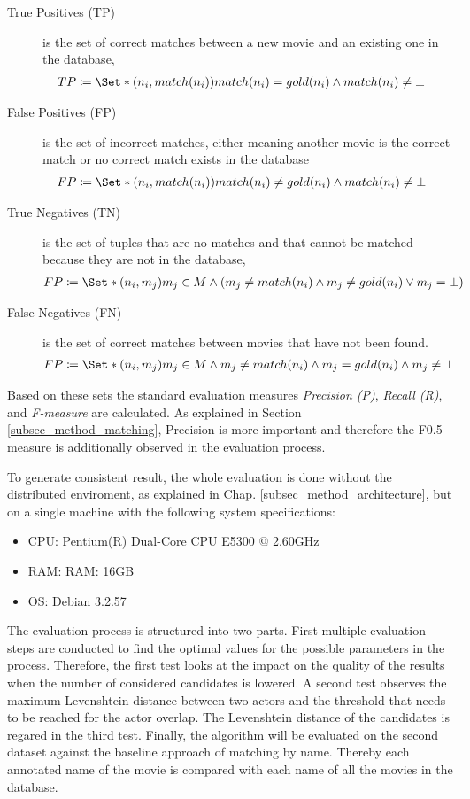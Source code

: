 \begin{description}
\item[True Positives (TP)] is the set of correct matches between a new movie and an existing one in the database,
\begin{align}
TP &\coloneqq \Set*{(n_i, match(n_i))}{match(n_i) = gold(n_i) \land match(n_i) \neq \bot}
\end{align}
\item[False Positives (FP)] is the set of incorrect matches, either meaning another movie is the correct match or no correct match exists in the database
\begin{align}
FP &\coloneqq \Set*{(n_i, match(n_i))}{match(n_i) \neq gold(n_i) \land match(n_i) \neq \bot}
\end{align}\item[True Negatives (TN)] is the set of tuples that are no matches and that cannot be matched because they are not in the database,
\begin{align}
FP &\coloneqq \Set*{(n_i, m_j)}{m_j \in M \land (m_j \neq match(n_i) \land m_j \neq gold(n_i) \lor m_j = \bot)}
\end{align}
\item[False Negatives (FN)] is the set of correct matches between movies that have not been found.
\begin{align}
FP &\coloneqq \Set*{(n_i, m_j)}{m_j \in M \land m_j \neq match(n_i) \land m_j = gold(n_i) \land m_j \neq \bot}
\end{align}
\end{description}

Based on these sets the standard evaluation measures \emph{Precision (P)}, \emph{Recall (R)}, and \emph{F-measure} are calculated.
As explained in Section \ref{subsec_method_matching}, Precision is more important and therefore the F0.5-measure is additionally observed in the evaluation process.

To generate consistent result, the whole evaluation is done without the distributed enviroment, as explained in Chap. \ref{subsec_method_architecture}, but on a single machine with the following system specifications:
\begin{itemize}
\item CPU: Pentium(R) Dual-Core  CPU E5300  @ 2.60GHz
\item RAM: RAM: 16GB
\item OS: Debian 3.2.57
\end{itemize}

The evaluation process is structured into two parts.
First multiple evaluation steps are conducted to find the optimal values for the possible parameters in the process.
Therefore, the first test looks at the impact on the quality of the results when the number of considered candidates is lowered.
A second test observes the maximum Levenshtein distance between two actors and the threshold that needs to be reached for the actor overlap.
The Levenshtein distance of the candidates is regared in the third test.
Finally, the algorithm will be evaluated on the second dataset against the baseline approach of matching by name.
Thereby each annotated name of the movie is compared with each name of all the movies in the database.

